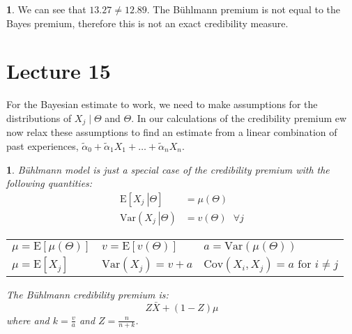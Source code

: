 \documentclass[english,12pt]{article}
\theoremstyle{plain}
\newtheorem*{theorem}{\protect\theoremname}
\theoremstyle{definition}
\newtheorem*{example}{\protect\examplename}
\theoremstyle{definition} %
\providecommand{\theoremname}{Theorem}
\providecommand{\examplename}{Example}
\newcommand{\ex}[1]{\mbox{E} \left[ #1 \right]}
\newcommand{\var}[1]{\mbox{Var} \left( #1 \right)}
\newcommand{\cov}[1]{\mbox{Cov} \left( #1 \right)}
\newcommand{\condex}[2]{\mbox{E} \left[ \left. #1 \ \right\vert \left. #2 \right. \right]}
\newcommand{\condvar}[2]{\mbox{Var} \left( \left. #1 \ \right\lvert \left. #2 \right. \right)}
\begin{document}
\begin{example}
We can see that $13.27\ne 12.89$.  The B\"{u}hlmann premium is not equal to the Bayes premium, therefore this is not an exact credibility measure.
\end{example}

\section*{Lecture 15}
For the Bayesian estimate to work, we need to make assumptions for the distributions of $X_j\mid\Theta$ and $\Theta$.  In our calculations of the credibility premium ew now relax these assumptions to find an estimate from a linear combination of past experiences, $\tilde{\alpha}_0+\tilde{\alpha}_1X_1+\ldots+\tilde{\alpha}_nX_n$.

\begin{theorem}
B\"{u}hlmann model is just a special case of the credibility premium with the following quantities:
\begin{align*}
\condex{X_j}{\Theta}&=\mu(\Theta)\\
\condvar{X_j}{\Theta}&=v(\Theta)\text{ }\forall j
\end{align*}

\begin{center}
\begin{tabular}{lll}
$\mu=\ex{\mu(\Theta)}$&$v=\ex{v(\Theta)}$&$a=\var{\mu(\Theta)}$\\
$\mu=\ex{X_j}$&$\var{X_j}=v+a$&$\cov{X_i,X_j}=a\text{ for } i\ne j$
\end{tabular}
\end{center}

The B\"{u}hlmann credibility premium is:
\[Z\bar{X}+(1-Z)\mu\]
where and $k=\frac{v}{a}$ and $Z=\frac{n}{n+k}$.
\end{theorem}
\end{document}

